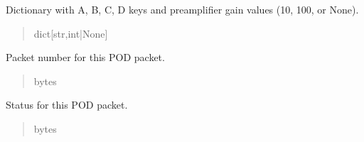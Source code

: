 \documentclass[letterpaper,10pt,english]{sphinxmanual}
\begin{document}
\begin{fulllineitems}
\begin{fulllineitems}
\begin{quote}
\begin{description}
\end{description}\end{quote}

\end{fulllineitems}


\begin{fulllineitems}
\label{\detokenize{Morelia.Packets:Morelia.Packets.Binary5.PacketBinary5._preampGain}}
\pysigstartsignatures
{}
\pysigstopsignatures
\sphinxAtStartPar
Dictionary with A, B, C, D keys and             preamplifier gain values (10, 100, or None).
\begin{quote}\begin{description}
\sphinxAtStartPar
dict{[}str,int|None{]}

\end{description}\end{quote}

\end{fulllineitems}


\begin{fulllineitems}
\label{\detokenize{Morelia.Packets:Morelia.Packets.Binary5.PacketBinary5.packetNumber}}
\pysigstartsignatures
{}
\pysigstopsignatures
\sphinxAtStartPar
Packet number for this POD packet.
\begin{quote}\begin{description}
\sphinxAtStartPar
bytes

\end{description}\end{quote}

\end{fulllineitems}


\begin{fulllineitems}
\label{\detokenize{Morelia.Packets:Morelia.Packets.Binary5.PacketBinary5.status}}
\pysigstartsignatures
{}
\pysigstopsignatures
\sphinxAtStartPar
Status for this POD packet.
\begin{quote}\begin{description}
\sphinxAtStartPar
bytes


\end{description}
\end{quote}
\end{fulllineitems}
\end{fulllineitems}
\end{document}
